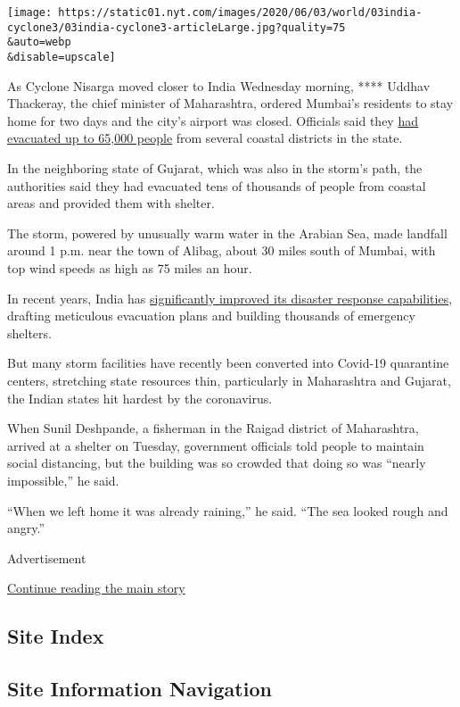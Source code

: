 \texttt{[image: https://static01.nyt.com/images/2020/06/03/world/03india-cyclone3/03india-cyclone3-articleLarge.jpg?quality=75\\\&auto=webp\\\&disable=upscale]}

As Cyclone Nisarga moved closer to India Wednesday morning, **** Uddhav
Thackeray, the chief minister of Maharashtra, ordered Mumbai's residents
to stay home for two days and the city's airport was closed. Officials
said they
\href{https://www.hindustantimes.com/mumbai-news/cyclone-nisarga-65-000-people-living-close-to-coast-of-maharashtra-evacuated/story-tJ4iXT8Fi8MJ5gxmExTioO.html}{had
evacuated up to 65,000 people} from several coastal districts in the
state.

In the neighboring state of Gujarat, which was also in the storm's path,
the authorities said they had evacuated tens of thousands of people from
coastal areas and provided them with shelter.

The storm, powered by unusually warm water in the Arabian Sea, made
landfall around 1 p.m. near the town of Alibag, about 30 miles south of
Mumbai, with top wind speeds as high as 75 miles an hour.

In recent years, India has
\href{https://www.nytimes.com/2019/05/04/world/asia/india-cyclone.html}{significantly
improved its disaster response capabilities}, drafting meticulous
evacuation plans and building thousands of emergency shelters.

But many storm facilities have recently been converted into Covid-19
quarantine centers, stretching state resources thin, particularly in
Maharashtra and Gujarat, the Indian states hit hardest by the
coronavirus.

When Sunil Deshpande, a fisherman in the Raigad district of Maharashtra,
arrived at a shelter on Tuesday, government officials told people to
maintain social distancing, but the building was so crowded that doing
so was ``nearly impossible,'' he said.

``When we left home it was already raining,'' he said. ``The sea looked
rough and angry.''

Advertisement

\protect\hyperlink{after-bottom}{Continue reading the main story}

\hypertarget{site-index}{%
\subsection{Site Index}\label{site-index}}

\hypertarget{site-information-navigation}{%
\subsection{Site Information
Navigation}\label{site-information-navigation}}

